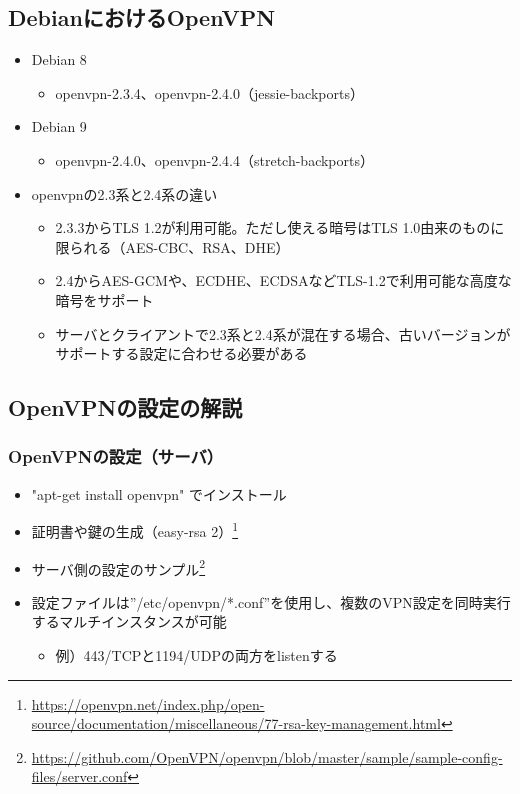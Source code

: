 \documentclass[mingoth,a4paper]{jsarticle}
\begin{document}
\subsection{DebianにおけるOpenVPN}

\begin{itemize}
\item Debian 8
  \begin{itemize}
  \item openvpn-2.3.4、openvpn-2.4.0（jessie-backports）
  \end{itemize} 
\item Debian 9
  \begin{itemize}
  \item openvpn-2.4.0、openvpn-2.4.4（stretch-backports）
  \end{itemize}
\item openvpnの2.3系と2.4系の違い
  \begin{itemize}
  \item 2.3.3からTLS 1.2が利用可能。ただし使える暗号はTLS 1.0由来のものに限られる（AES-CBC、RSA、DHE）
  \item 2.4からAES-GCMや、ECDHE、ECDSAなどTLS-1.2で利用可能な高度な暗号をサポート
  \item サーバとクライアントで2.3系と2.4系が混在する場合、古いバージョンがサポートする設定に合わせる必要がある
  \end{itemize}
\end{itemize}


\subsection{OpenVPNの設定の解説}

\subsubsection{OpenVPNの設定（サーバ）}

\begin{itemize}
\item "apt-get install openvpn" でインストール
\item 証明書や鍵の生成（easy-rsa 2）\footnote{\url{https://openvpn.net/index.php/open-source/documentation/miscellaneous/77-rsa-key-management.html}}
\item サーバ側の設定のサンプル\footnote{\url{https://github.com/OpenVPN/openvpn/blob/master/sample/sample-config-files/server.conf}}
\item 設定ファイルは''/etc/openvpn/*.conf''を使用し、複数のVPN設定を同時実行するマルチインスタンスが可能
  \begin{itemize}
  \item 例）443/TCPと1194/UDPの両方をlistenする
  \end{itemize}
\end{itemize}
\end{document}
